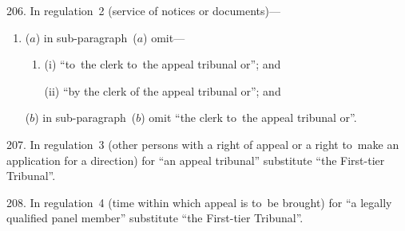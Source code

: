 \documentclass[12pt,a4paper]{article}
\begin{document}
\medskip

206.  In regulation~2 (service of notices or documents)—
\begin{enumerate}\item[]
($a$) in sub-paragraph~($a$)  omit—
\begin{enumerate}\item[]
(i) “to~the clerk to~the appeal tribunal or”; and

(ii) “by the clerk of the appeal tribunal or”; and
\end{enumerate}

($b$) in sub-paragraph~($b$)  omit “the clerk to~the appeal tribunal or”.
\end{enumerate}

\medskip

207.  In regulation~3 (other persons with a right of appeal or a right to~make an application for a direction) for “an appeal tribunal” substitute “the First-tier Tribunal”.

\medskip

208.  In regulation~4 (time within which appeal is to~be brought) for “a legally qualified panel member” substitute “the First-tier Tribunal”.

\medskip
\end{document}
